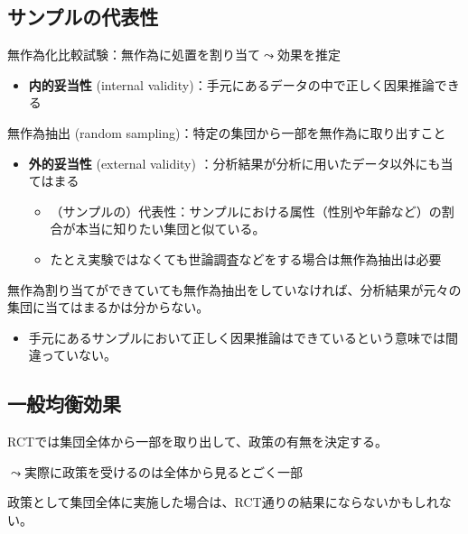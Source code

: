 \documentclass[
  xelatex,
  ja=standard]{bxjsarticle}
\providecommand{\tightlist}{%
  \setlength{\itemsep}{0pt}\setlength{\parskip}{0pt}}\usepackage{longtable,booktabs,array}
\begin{document}
\hypertarget{ux30b5ux30f3ux30d7ux30ebux306eux4ee3ux8868ux6027}{%
\subsection{サンプルの代表性}\label{ux30b5ux30f3ux30d7ux30ebux306eux4ee3ux8868ux6027}}

無作為化比較試験：無作為に処置を割り当て\(\leadsto\)効果を推定

\begin{itemize}
\tightlist
\item
  \textbf{内的妥当性} (internal
  validity)：手元にあるデータの中で正しく因果推論できる
\end{itemize}

無作為抽出 (random sampling)：特定の集団から一部を無作為に取り出すこと

\begin{itemize}
\tightlist
\item
  \textbf{外的妥当性} (external validity)
  ：分析結果が分析に用いたデータ以外にも当てはまる

  \begin{itemize}
  \tightlist
  \item
    （サンプルの）代表性：サンプルにおける属性（性別や年齢など）の割合が本当に知りたい集団と似ている。
  \item
    たとえ実験ではなくても世論調査などをする場合は無作為抽出は必要
  \end{itemize}
\end{itemize}

無作為割り当てができていても無作為抽出をしていなければ、分析結果が元々の集団に当てはまるかは分からない。

\begin{itemize}
\tightlist
\item
  手元にあるサンプルにおいて正しく因果推論はできているという意味では間違っていない。
\end{itemize}

\hypertarget{ux4e00ux822cux5747ux8861ux52b9ux679c}{%
\subsection{一般均衡効果}\label{ux4e00ux822cux5747ux8861ux52b9ux679c}}

RCTでは集団全体から一部を取り出して、政策の有無を決定する。

\(\leadsto\)実際に政策を受けるのは全体から見るとごく一部

政策として集団全体に実施した場合は、RCT通りの結果にならないかもしれない。
\end{document}
